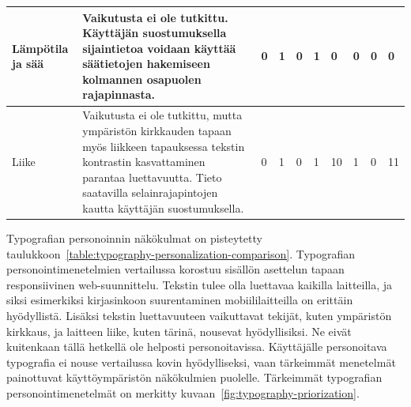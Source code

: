 \documentclass[finnish, 12pt, a4paper, elec, utf8, a-1b]{aaltothesis}
\begin{document}
{\begin{longtable}{p{2.5cm}|p{6cm}|p{0.5cm}p{0.5cm}p{0.5cm}|p{0.5cm}|p{0.5cm}p{0.5cm}p{0.5cm}|p{0.5cm}|}
    \midrule
    Lämpötila ja sää                       & Vaikutusta ei ole tutkittu. Käyttäjän suostumuksella sijaintietoa voidaan käyttää säätietojen hakemiseen kolmannen osapuolen rajapinnasta.                                                                                                                    & 0                                          & 1                                   & 0                                      & 1                            & 0                                               & 0                                         & 0                                         & 0                            \\
    \midrule
    Liike                                  & Vaikutusta ei ole tutkittu, mutta ympäristön kirkkauden tapaan myös liikkeen tapauksessa tekstin kontrastin kasvattaminen parantaa luettavuutta. Tieto saatavilla selainrajapintojen kautta käyttäjän suostumuksella.                                         & 0                                          & 1                                   & 0                                      & 1                            & 10                                              & 1                                         & 0                                         & 11                           \\
\end{longtable}
}

Typografian personoinnin näkökulmat on pisteytetty
taulukkoon~\ref{table:typography-personalization-comparison}. Typografian
personointimenetelmien vertailussa korostuu sisällön asettelun tapaan
responsiivinen web-suunnittelu. Tekstin tulee olla luettavaa kaikilla
laitteilla, ja siksi esimerkiksi kirjasinkoon suurentaminen mobiililaitteilla on
erittäin hyödyllistä. Lisäksi tekstin luettavuuteen vaikuttavat tekijät, kuten
ympäristön kirkkaus, ja laitteen liike, kuten tärinä, nousevat hyödyllisiksi. Ne
eivät kuitenkaan tällä hetkellä ole helposti personoitavissa. Käyttäjälle
personoitava typografia ei nouse vertailussa kovin hyödylliseksi, vaan
tärkeimmät menetelmät painottuvat käyttöympäristön näkökulmien puolelle.
Tärkeimmät typografian personointimenetelmät on merkitty
kuvaan~\ref{fig:typography-priorization}.
\end{document}
